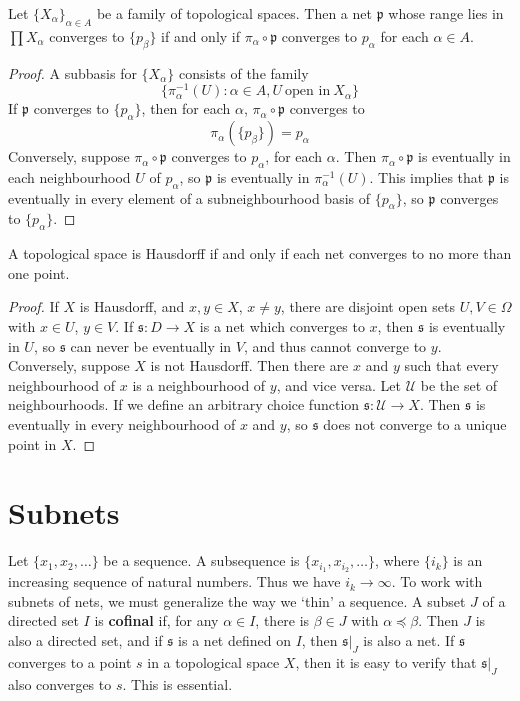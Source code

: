 \begin{theorem}
    Let $\{ X_\alpha \}_{\alpha \in A}$ be a family of topological spaces. Then a net $\mathfrak{p}$ whose range lies in $\prod X_\alpha$ converges to $\{ p_\beta \}$ if and only if $\pi_\alpha \circ \mathfrak{p}$ converges to $p_\alpha$ for each $\alpha \in A$.
\end{theorem}
\begin{proof}
    A subbasis for $\{ X_\alpha \}$ consists of the family
    \[ \{ \pi_\alpha^{-1}(U) : \alpha \in A, U \ \text{open in}\ X_\alpha \} \]
    If $\mathfrak{p}$ converges to $\{ p_\alpha \}$, then for each $\alpha$, $\pi_\alpha \circ \mathfrak{p}$ converges to
    \[ \pi_\alpha( \{ p_\beta \}) = p_\alpha \]
    Conversely, suppose $\pi_\alpha \circ \mathfrak{p}$ converges to $p_\alpha$, for each $\alpha$. Then $\pi_\alpha \circ \mathfrak{p}$ is eventually in each neighbourhood $U$ of $p_\alpha$, so $\mathfrak{p}$ is eventually in $\pi_\alpha^{-1}(U)$. This implies that $\mathfrak{p}$ is eventually in every element of a subneighbourhood basis of $\{ p_\alpha \}$, so $\mathfrak{p}$ converges to $\{ p_\alpha \}$.
\end{proof}

\begin{theorem}
    A topological space is Hausdorff if and only if each net converges to no more than one point.
\end{theorem}
\begin{proof}
    If $X$ is Hausdorff, and $x,y \in X$, $x \neq y$, there are disjoint open sets $U,V \in \Omega$ with $x \in U$, $y \in V$. If $\mathfrak{s}: D \to X$ is a net which converges to $x$, then $\mathfrak{s}$ is eventually in $U$, so $\mathfrak{s}$ can never be eventually in $V$, and thus cannot converge to $y$. Conversely, suppose $X$ is not Hausdorff. Then there are $x$ and $y$ such that every neighbourhood of $x$ is a neighbourhood of $y$, and vice versa. Let $\mathcal{U}$ be the set of neighbourhoods. If we define an arbitrary choice function $\mathfrak{s}: \mathcal{U} \to X$. Then $\mathfrak{s}$ is eventually in every neighbourhood of $x$ and $y$, so $\mathfrak{s}$ does not converge to a unique point in $X$.
\end{proof}

\section{Subnets}

Let $\{ x_1, x_2, \dots \}$ be a sequence. A subsequence is $\{ x_{i_1}, x_{i_2}, \dots \}$, where $\{ i_k \}$ is an increasing sequence of natural numbers. Thus we have $i_k \to \infty$. To work with subnets of nets, we must generalize the way we `thin' a sequence. A subset $J$ of a directed set $I$ is {\bf cofinal} if, for any $\alpha \in I$, there is $\beta \in J$ with $\alpha \preceq \beta$. Then $J$ is also a directed set, and if $\mathfrak{s}$ is a net defined on $I$, then $\mathfrak{s}|_J$ is also a net. If $\mathfrak{s}$ converges to a point $s$ in a topological space $X$, then it is easy to verify that $\mathfrak{s}|_J$ also converges to $s$. This is essential.

